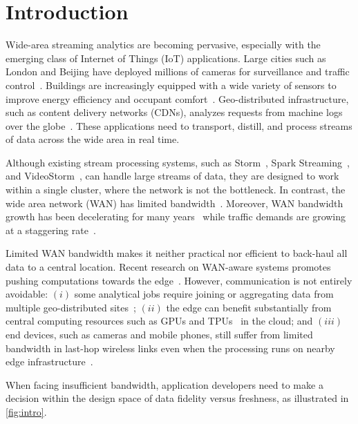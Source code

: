 \section{Introduction}

Wide-area streaming analytics are becoming pervasive, especially with the
emerging class of Internet of Things (IoT) applications.  Large cities such as
London and Beijing have deployed millions of cameras for surveillance and
traffic control~\cite{skynet, london.surveillance}. Buildings are increasingly
equipped with a wide variety of sensors to improve energy efficiency and
occupant comfort~\cite{krioukov2012building}. Geo-distributed infrastructure,
such as content delivery networks (CDNs), analyzes requests from machine logs
over the globe~\cite{mukerjee2015practical}. These applications need to
transport, distill, and process streams of data across the wide area in real
time.

Although existing stream processing systems, such as
Storm~\cite{toshniwal2014storm}, Spark Streaming~\cite{zaharia2013discretized},
and VideoStorm~\cite{zhang2017live}, can handle large streams of data, they are
designed to work within a single cluster, where the network is not the
bottleneck.  In contrast, the wide area network (WAN) has limited
bandwidth~\cite{hsieh17gaia, vulimiri2015global}.  Moreover, WAN bandwidth
growth has been decelerating for many years~\cite{global2016telegeography} while
traffic demands are growing at a staggering rate~\cite{index2013zettabyte}.

Limited WAN bandwidth makes it neither practical nor efficient to back-haul all
data to a central location.  Recent research on WAN-aware systems promotes
pushing computations towards the edge~\cite{rabkin2014aggregation,
  satyanarayanan2009case}. However, communication is not entirely avoidable:
$(i)$ some analytical jobs require joining or aggregating data from multiple
geo-distributed sites~\cite{pu2015low, viswanathan2016clarinet}; $(ii)$ the edge
can benefit substantially from central computing resources such as GPUs and
TPUs~\cite{abadi2016tensorflow} in the cloud; and $(iii)$ end devices, such as
cameras and mobile phones, still suffer from limited bandwidth in last-hop
wireless links even when the processing runs on nearby edge
infrastructure~\cite{abari2017enabling, zhang2015design}.

When facing insufficient bandwidth, application developers need to make a
decision within the design space of data fidelity versus freshness, as
illustrated in \autoref{fig:intro}.

